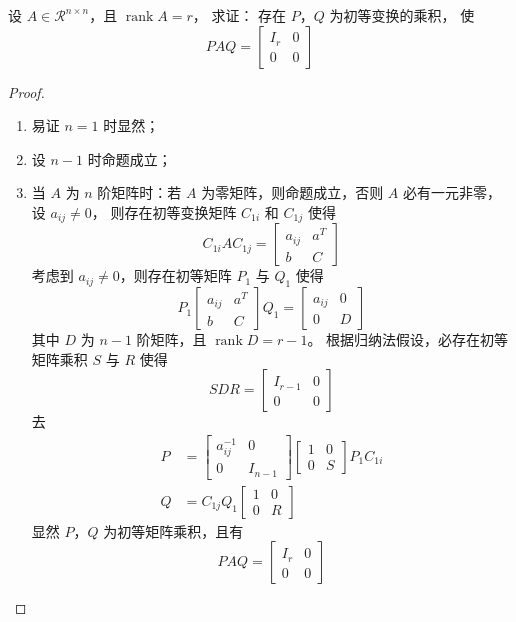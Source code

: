 \documentclass[twoside,openright]{book}
\begin{document}
\begin{CJK*}{UTF8}{}
\begin{quest}
\label{quest:28}
设 $A \in \mathcal{R}^{n \times n}$，且 $\operatorname{rank} A = r$，
求证：
存在 $P$，$Q$ 为初等变换的乘积，
使
\[
P A Q =
\begin{bmatrix}
I_r & 0 \\
0   & 0
\end{bmatrix}
\]
\end{quest}
\begin{proof}
$ $

\begin{enumerate}
\item
易证 $n=1$ 时显然；
\item
设 $n-1$ 时命题成立；
\item
当 $A$ 为 $n$ 阶矩阵时：若 $A$ 为零矩阵，则命题成立，否则 $A$ 必有一元非零，设 $a_{ij} \neq 0$，
则存在初等变换矩阵 $C_{1i}$ 和 $C_{1j}$ 使得
\[
C_{1i} A C_{1j} =
\begin{bmatrix}
a_{ij} & a^T \\
b      & C
\end{bmatrix}
\]
考虑到 $a_{ij} \neq 0$，则存在初等矩阵 $P_1$ 与 $Q_1$ 使得
\[
P_1
\begin{bmatrix}
a_{ij} & a^T \\
b      & C
\end{bmatrix}
Q_1 =
\begin{bmatrix}
a_{ij} & 0 \\
0      & D
\end{bmatrix}
\]
其中 $D$ 为 $n-1$ 阶矩阵，且 $\operatorname{rank} D = r - 1$。
根据归纳法假设，必存在初等矩阵乘积 $S$ 与 $R$ 使得
\[
S D R =
\begin{bmatrix}
I_{r-1} & 0 \\
0       & 0
\end{bmatrix}
\]
去
\[
\begin{split}
P &=
\begin{bmatrix}
a_{ij}^{-1} & 0 \\
0           & I_{n-1}
\end{bmatrix}
\begin{bmatrix}
1 & 0 \\
0 & S
\end{bmatrix}
P_1 C_{1i} \\
Q &=
C_{1j} Q_1
\begin{bmatrix}
1 & 0 \\
0 & R
\end{bmatrix}
\end{split}
\]
显然 $P$，$Q$ 为初等矩阵乘积，且有
\[
P A Q =
\begin{bmatrix}
I_r & 0 \\
0   & 0
\end{bmatrix}
\]
\end{enumerate}
\end{proof}


\end{CJK*}
\end{document}
